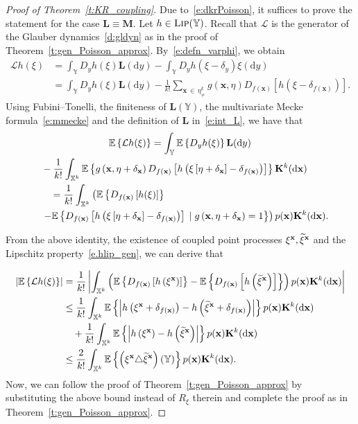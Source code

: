 \documentclass[AHL,Unicode,longabstracts]{cedram}
\newcommand*\bL{\mathbf{L}}
\newcommand*\bM{\mathbf{M}}
\newcommand*\bK{\mathbf{K}}
\newcommand{\bx}{\mathbf{x}}
\newcommand*\X{\mathbb{X}}
\newcommand*\Y{\mathbb{Y}}
\newcommand{\E}{\mathbb{E}}
\newcommand*\cL{\mathcal{L}}
\newcommand*\txi{\tilde{\xi}}
\newcommand*\cLip{\textsc{Lip}}
\newcommand*\md{\mathrm{d}}
\newcommand{\given}{\;|\;}
\newcommand{\mean}[1] {\E\left\{{#1}\right\}}
\newcommand{\cmean}[2] {\E\left\{#1\given #2\right\}}
\newcommand{\param}[1]{\left(#1\right)}
\newcommand{\abs}[1] {\left| {#1}\right|}
\let\oldtilde\tilde
\renewcommand*{\tilde}[1]{\mathchoice{\widetilde{#1}}{\widetilde{#1}}{\oldtilde{#1}}{\oldtilde{#1}}}
\begin{document}
\begin{proof}[Proof of Theorem~\ref{t:KR_coupling}]
Due to~\eqref{e:dkrPoisson}, it suffices to prove the statement for the case $\bL \equiv \bM$. Let $h\in\cLip(\Y)$. Recall that $\cL$ is the generator of the Glauber dynamics~\eqref{d:gldyn} as in the proof of Theorem~\ref{t:gen_Poisson_approx}. By~\eqref{e:defn_varphi}, we obtain
\begin{align*}
\cL h(\xi) & = \int_{\Y} D_y h(\xi) \bL(\md y) - \int_{\Y} D_yh\left(\xi - \delta_y\right) \xi(\md y) \\
& = \int_{\Y} D_y h(\xi) \bL(\md y) -  \frac{1}{k!} \sum_{\bx\,\in\,\eta_{\neq}^{k}} g(\bx,\eta)D_{f(\bx)}\left[h\left(\xi - \delta_{f(\bx)}\right)\right].
\end{align*}
Using Fubini--Tonelli, the finiteness of $\bL(\Y)$, the multivariate Mecke formula~\eqref{e:mmecke} and the definition of $\bL$ in~\eqref{e:int_L}, we have that
\begin{multline}\label{e:exp_lhphi}
\mean{\cL h(\xi)}
= \int_{\Y} \mean{D_yh(\xi)} \bL(\md y)\\
\begin{aligned}
&\quad- \frac{1}{k!}\int_{\X^k} \mean{g\left(\bx,\eta+ \delta_{\bx}\right)D_{f(\bx)}\left[h\left(\xi\left[\eta + \delta_{\bx}\right] - \delta_{f(\bx)}\right)\right]} \bK^k(\md \bx) \\
&\mkern35mu= \frac{1}{k!} \int_{\X^k} \param{\mean{D_{f(\bx)}\left[h(\xi)\right]}\right.\\
&\quad\left. - \cmean{D_{f(\bx)}\left[h\left(\xi\left[\eta + \delta_{\bx}\right] - \delta_{f(\bx)}\right)\right]}{g\left(\bx,\eta+ \delta_{\bx}\right) = 1}} p(\bx) \bK^k(\md \bx).
\end{aligned}
\end{multline}

From the above identity, the existence of coupled point processes $\xi^{\bx}, \txi^{\bx}$ and the Lipschitz property~\eqref{e.hlip_gen}, we can derive that

\begin{align*}
\left|\mean{\cL h(\xi)}\right| &= \frac{1}{k!}\abs{\int_{\X^k} \param{ \mean{D_{f(\bx)}\left[h\left(\xi^{\bx}\right)\right]} - \mean{D_{f(\bx)}\left[h\left(\txi^{\bx}\right)\right]}} p(\bx) \bK^k(\md \bx)} \\
& \leq \frac{1}{k!} \int_{\X^k} \mean{\abs{h\left(\xi^{\bx} + \delta_{f(\bx)}\right) - h\left(\txi^{\bx} + \delta_{f(\bx)}\right)}} p(\bx)\bK^k(\md \bx)\\
&\quad + \frac{1}{k!} \int_{\X^k} \mean{\abs{h\left(\xi^{\bx}\right) - h\left(\txi^{\bx}\right)}} p(\bx)\bK^k(\md \bx) \\
& \leq \frac{2}{k!} \int_{\X^k} \mean{\left(\xi^{\bx} \triangle \txi^{\bx}\right)(\Y)} p(\bx)\bK^k(\md \bx).
\end{align*}
Now, we can follow the proof of Theorem~\ref{t:gen_Poisson_approx} by substituting the above bound instead of $R_{\xi}$ therein and complete the proof as in Theorem~\ref{t:gen_Poisson_approx}.
\end{proof}
\end{document}
